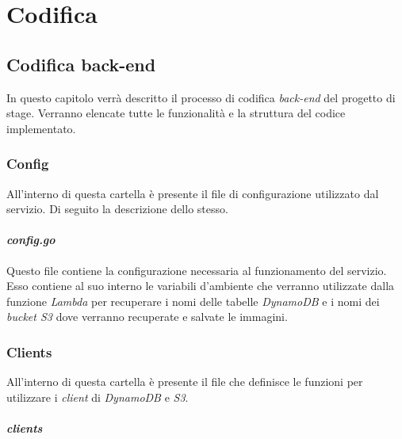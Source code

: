 \chapter{Codifica}
\label{cap:codifica}


\section{Codifica back-end}

In questo capitolo verrà descritto il processo di codifica \emph{back-end} del
progetto di stage. Verranno elencate tutte le funzionalità e la struttura del
codice implementato.

\subsection{Config}

All'interno di questa cartella è presente il file di configurazione utilizzato
dal servizio. Di seguito la descrizione dello stesso.

\subsubsection{\emph{config.go}}

Questo file contiene la configurazione necessaria al funzionamento del servizio.
Esso contiene al suo interno le variabili d'ambiente che verranno utilizzate
dalla funzione \emph{Lambda} per recuperare i nomi delle tabelle \emph{DynamoDB}
e i nomi dei \emph{bucket S3} dove verranno recuperate e salvate le immagini.

\subsection{Clients}

All'interno di questa cartella è presente il file che definisce le funzioni per
utilizzare i \emph{client} di \emph{DynamoDB} e \emph{S3}.

\subsubsection{\emph{clients}}

